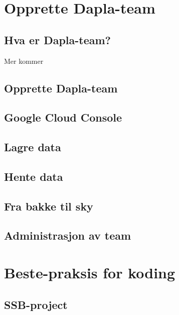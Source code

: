 \documentclass[
  letterpaper,
  DIV=11,
  numbers=noendperiod]{scrreprt}
\begin{document}
\part{Opprette Dapla-team}

\hypertarget{hva-er-dapla-team}{%
\chapter{Hva er Dapla-team?}\label{hva-er-dapla-team}}

Mer kommer

\hypertarget{opprette-dapla-team}{%
\chapter{Opprette Dapla-team}\label{opprette-dapla-team}}

\hypertarget{google-cloud-console}{%
\chapter{Google Cloud Console}\label{google-cloud-console}}

\hypertarget{lagre-data}{%
\chapter{Lagre data}\label{lagre-data}}

\hypertarget{hente-data}{%
\chapter{Hente data}\label{hente-data}}

\hypertarget{fra-bakke-til-sky}{%
\chapter{Fra bakke til sky}\label{fra-bakke-til-sky}}

\hypertarget{administrasjon-av-team}{%
\chapter{Administrasjon av team}\label{administrasjon-av-team}}

\part{Beste-praksis for koding}

\hypertarget{ssb-project}{%
\chapter{SSB-project}\label{ssb-project}}
\end{document}
